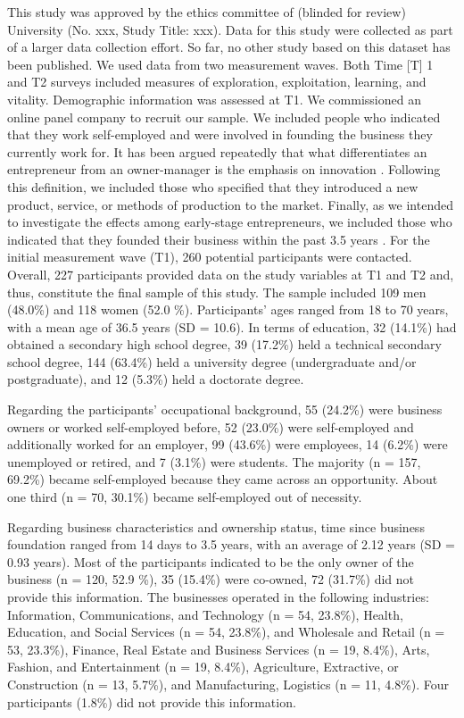 \documentclass[man, 12pt, a4paper, noextraspace]{apa6}
\begin{document}
This study was approved by the ethics committee of (blinded for review) University (No. xxx, Study Title: xxx). 
Data for this study were collected as part of a larger data collection effort. 
So far, no other study based on this dataset has been published. 
We used data from two measurement waves.
Both Time [T] 1 and T2 surveys included measures of exploration, exploitation, learning, and vitality. 
Demographic information was assessed at T1. 
We commissioned an online panel company to recruit our sample. 
We included people who indicated that they work self-employed and were involved in founding the business they currently work for. 
It has been argued repeatedly that what differentiates an entrepreneur from an owner-manager is the emphasis on innovation \parencite[see, e.g.,][]{Carland.2007, Schumpeter.1934, Gorgievski2016a}. 
Following this definition, we included those who specified that they introduced a new product, service, or methods of production to the market.
Finally, as we intended to investigate the effects among early-stage entrepreneurs, we included those who indicated that they founded their business within the past 3.5 years \parencite{Bosma.2019}. 
For the initial measurement wave (T1), 260 potential participants were contacted. 
Overall, 227 participants provided data on the study variables at T1 and T2 and, thus, constitute the final sample of this study. 
The sample included 109 men (48.0\%) and 118 women (52.0 \%). 
Participants’ ages ranged from 18 to 70 years, with a mean age of 36.5 years (SD = 10.6). 
In terms of education, 32 (14.1\%) had obtained a secondary high school degree, 39 (17.2\%) held a technical secondary school degree, 144 (63.4\%) held a university degree (undergraduate and/or postgraduate), and 12 (5.3\%) held a doctorate degree. \par 
Regarding the participants' occupational background, 55 (24.2\%) were business owners or worked self-employed before, 52 (23.0\%) were self-employed and additionally worked for an employer, 99 (43.6\%) were employees, 14 (6.2\%) were unemployed or retired, and 7 (3.1\%) were students. 
The majority (n = 157, 69.2\%) became self-employed because they came across an opportunity. 
About one third (n = 70, 30.1\%) became self-employed out of necessity. \par 
Regarding business characteristics and ownership status, time since business foundation ranged from 14 days to 3.5 years, with an average of 2.12 years (SD = 0.93 years). 
Most of the participants indicated to be the only owner of the business (n = 120, 52.9 \%), 35 (15.4\%) were co-owned, 72 (31.7\%) did not provide this information. 
The businesses operated in the following industries: Information, Communications, and Technology (n = 54, 23.8\%), Health, Education, and Social Services (n = 54, 23.8\%), and Wholesale and Retail (n = 53, 23.3\%), Finance, Real Estate and Business Services (n = 19, 8.4\%), Arts, Fashion, and Entertainment (n = 19, 8.4\%), Agriculture, Extractive, or Construction (n = 13, 5.7\%), and Manufacturing, Logistics (n = 11, 4.8\%). 
Four participants (1.8\%) did not provide this information.
\end{document}
